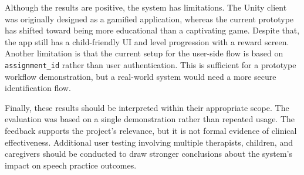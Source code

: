 Although the results are positive, the system has limitations. The Unity client was originally designed as a gamified application, whereas the current prototype has shifted toward being more educational than a captivating game. Despite that, the app still has a child-friendly UI and level progression with a reward screen. Another limitation is that the current setup for the user-side flow is based on \texttt{assignment\_id} rather than user authentication. This is sufficient for a prototype workflow demonstration, but a real-world system would need a more secure identification flow.

Finally, these results should be interpreted within their appropriate scope. The evaluation was based on a single demonstration rather than repeated usage. The feedback supports the project's relevance, but it is not formal evidence of clinical effectiveness. Additional user testing involving multiple therapists, children, and caregivers should be conducted to draw stronger conclusions about the system's impact on speech practice outcomes.
